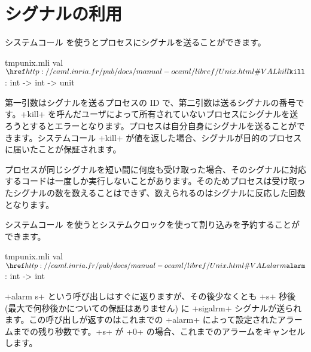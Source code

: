 \section{\label{sec/usingsignals}シグナルの利用}

システムコール  を使うとプロセスにシグナルを送ることができます。
%
\begin{listingcodefile}{tmpunix.mli}
val $\libvalue{Unix}{kill}$ : int -> int -> unit
\end{listingcodefile}
%
第一引数はシグナルを送るプロセスの ID で、第二引数は送るシグナルの番号です。\ml+kill+ を呼んだユーザによって所有されていないプロセスにシグナルを送ろうとするとエラーとなります。プロセスは自分自身にシグナルを送ることができます。システムコール \ml+kill+ が値を返した場合、シグナルが目的のプロセスに届いたことが保証されます。

プロセスが同じシグナルを短い間に何度も受け取った場合、そのシグナルに対応するコードは一度しか実行しないことがあります。そのためプロセスは受け取ったシグナルの数を数えることはできず、数えられるのはシグナルに反応した回数となります。

システムコール  を使うとシステムクロックを使って割り込みを予約することができます。
%
\begin{listingcodefile}{tmpunix.mli}
val $\libvalue{Unix}{alarm}$ : int -> int
\end{listingcodefile}
%
\ml+alarm s+ という呼び出しはすぐに返りますが、その後少なくとも \ml+s+ 秒後 (最大で何秒後かについての保証はありません) に \ml+sigalrm+ シグナルが送られます。この呼び出しが返すのはこれまでの \ml+alarm+ によって設定されたアラームまでの残り秒数です。\ml+s+ が \ml+0+ の場合、これまでのアラームをキャンセルします。

